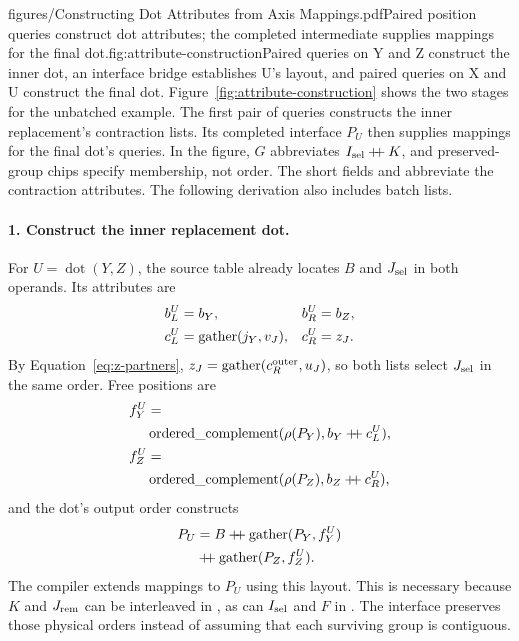 \begin{figuretext}{figures/Constructing Dot Attributes from Axis Mappings.pdf}{Paired position queries construct dot attributes; the completed intermediate supplies mappings for the final dot.}{fig:attribute-construction}{Paired queries on Y and Z construct the inner dot, an interface bridge
establishes U's layout, and paired queries on X and U construct the final dot.}
Figure~\ref{fig:attribute-construction} shows the two stages for the unbatched
example. The first pair of queries constructs the inner replacement's
contraction lists. Its completed interface $P_U$ then supplies mappings for
the final dot's queries. In the figure, $G$ abbreviates
$I_{\mathrm{sel}}\mathbin{+\!\!+} K$, and preserved-group chips specify membership, not order.
The short fields  and  abbreviate the
contraction attributes. The following derivation also includes batch lists.


\paragraph{1. Construct the inner replacement dot.}
For $U=\operatorname{dot}(Y,Z)$, the source table already locates $B$ and
$J_{\mathrm{sel}}$ in both operands. Its attributes are
\begin{equation}
\begin{aligned}
 b_L^U&=b_Y,&b_R^U&=b_Z,\\
 c_L^U&=\operatorname{gather}(j_Y,v_J),&c_R^U&=z_J.
\end{aligned}
\end{equation}
By Equation~\eqref{eq:z-partners}, $z_J=\operatorname{gather}(c_R^{\mathrm{outer}},u_J)$,
so both lists select $J_{\mathrm{sel}}$ in the same order. Free positions are
\begin{equation}
\begin{aligned}
 f_Y^U&=\\
 &\operatorname{ordered\_complement}(\rho(P_Y),b_Y\mathbin{+\!\!+} c_L^U),\\
 f_Z^U&=\\
 &\operatorname{ordered\_complement}(\rho(P_Z),b_Z\mathbin{+\!\!+} c_R^U),
\end{aligned}
\end{equation}
and the dot's output order constructs
\begin{equation}
\begin{aligned}
 P_U&=B\mathbin{+\!\!+}\operatorname{gather}(P_Y,f_Y^U)\\
 &\mathbin{+\!\!+}\operatorname{gather}(P_Z,f_Z^U).
\end{aligned}
 \label{eq:u-interface}
\end{equation}
The compiler extends mappings to $P_U$ using this layout. This is necessary
because $K$ and $J_{\mathrm{rem}}$ can be interleaved in , as can $I_{\mathrm{sel}}$ and
$F$ in . The interface preserves those physical orders instead of
assuming that each surviving group is contiguous.

\end{figuretext}

